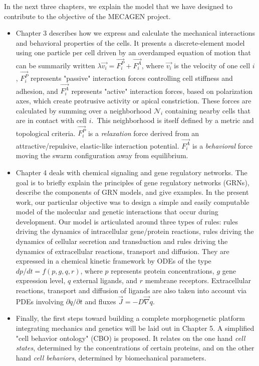   In the next three chapters, we explain the model that we have designed to contribute to the objective of the MECAGEN project.  
\begin{itemize}
	\item Chapter 3 describes how we express and calculate the mechanical interactions and behavioral properties of the cells. It presents a discrete-element model using one particle per cell driven by an overdamped equation of motion that can be summarily written $\lambda \vec{v_i} = \vec{F_i^P}+\vec{F_i^A}$, where $\vec{v_i}$ is the velocity of one cell $i$, $\vec{F_i^P}$ represents "passive" interaction forces controlling cell stiffness and adhesion, and $\vec{F_i^A}$ represents "active" interaction forces, based on polarization axes, which create protrusive activity or apical constriction. These forces are calculated by summing over a neighborhood $\mathcal{N}_i$ containing nearby cells that are in contact with cell $i$. This neighborhood is itself defined by a metric and topological criteria. $\vec{F_i^P}$ is a \textit{relaxation} force derived from an attractive/repulsive, elastic-like interaction potential. $\vec{F_i^A}$ is a \textit{behavioral} force moving the swarm configuration away from equilibrium.
	\item Chapter 4 deals with chemical signaling and gene regulatory networks. The goal is to briefly explain the principles of gene regulatory networks (GRNs), describe the components of GRN models, and give examples. In the present work, our particular objective was to design a simple and easily computable model of the molecular and genetic interactions that occur during development. Our model is articulated around three types of rules: rules driving the dynamics of intracellular gene/protein reactions, rules driving the dynamics of cellular secretion and transduction and rules driving the dynamics of extracellular reactions, transport and diffusion. They are expressed in a chemical kinetic framework by ODEs of the type $dp/dt=f(p,g,q,r)$, where $p$ represents protein concentrations, $g$ gene expression level, $q$ external ligands, and $r$ membrane receptors. Extracellular reactions, transport and diffusion of ligands are also taken into account via PDEs involving $\partial q/\partial t$ and fluxes $\vec{J}=-D\vec{\nabla}q$.
	\item Finally, the first steps toward building a complete morphogenetic platform integrating mechanics and genetics will be laid out in Chapter 5. A simplified "cell behavior ontology" (CBO) is proposed. It relates on the one hand \textit{cell states}, determined by the concentrations of certain proteins, and on the other hand \textit{cell behaviors}, determined by biomechanical parameters.
\end{itemize}

